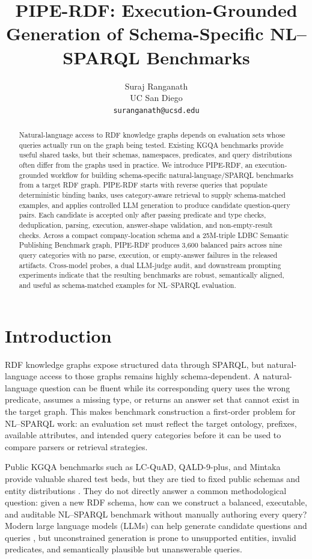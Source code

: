 \documentclass[11pt]{article}
\title{PIPE-RDF: Execution-Grounded Generation of Schema-Specific NL--SPARQL Benchmarks}
\author{
  Suraj Ranganath \\
  UC San Diego \\
  \texttt{suranganath@ucsd.edu}
}
\begin{document}
\maketitle

\begin{abstract}
Natural-language access to RDF knowledge graphs depends on evaluation sets whose queries actually run on the graph being tested. Existing KGQA benchmarks provide useful shared tasks, but their schemas, namespaces, predicates, and query distributions often differ from the graphs used in practice. We introduce PIPE-RDF, an execution-grounded workflow for building schema-specific natural-language/SPARQL benchmarks from a target RDF graph. PIPE-RDF starts with reverse queries that populate deterministic binding banks, uses category-aware retrieval to supply schema-matched examples, and applies controlled LLM generation to produce candidate question-query pairs. Each candidate is accepted only after passing predicate and type checks, deduplication, parsing, execution, answer-shape validation, and non-empty-result checks. Across a compact company-location schema and a 25M-triple LDBC Semantic Publishing Benchmark graph, PIPE-RDF produces 3{,}600 balanced pairs across nine query categories with no parse, execution, or empty-answer failures in the released artifacts. Cross-model probes, a dual LLM-judge audit, and downstream prompting experiments indicate that the resulting benchmarks are robust, semantically aligned, and useful as schema-matched examples for NL--SPARQL evaluation.
\end{abstract}

\section{Introduction}
RDF knowledge graphs expose structured data through SPARQL, but natural-language access to those graphs remains highly schema-dependent. A natural-language question can be fluent while its corresponding query uses the wrong predicate, assumes a missing type, or returns an answer set that cannot exist in the target graph. This makes benchmark construction a first-order problem for NL--SPARQL work: an evaluation set must reflect the target ontology, prefixes, available attributes, and intended query categories before it can be used to compare parsers or retrieval strategies.

Public KGQA benchmarks such as LC-QuAD, QALD-9-plus, and Mintaka provide valuable shared test beds, but they are tied to fixed public schemas and entity distributions \citep{Trivedi_2017,perevalov2022qald9plusmultilingualdatasetquestion,sen2022mintakacomplexnaturalmultilingual}. They do not directly answer a common methodological question: given a new RDF schema, how can we construct a balanced, executable, and auditable NL--SPARQL benchmark without manually authoring every query? Modern large language models (LLMs) can help generate candidate questions and queries \citep{brown2020languagemodelsfewshotlearners,touvron2023llamaopenefficientfoundation}, but unconstrained generation is prone to unsupported entities, invalid predicates, and semantically plausible but unanswerable queries.
\end{document}
